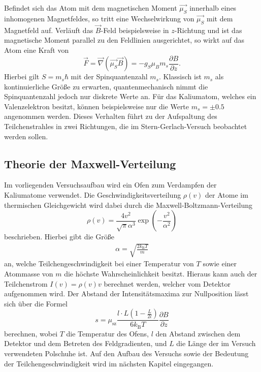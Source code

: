 Befindet sich das Atom mit dem magnetischen Moment $\vec{\mu_S}$ innerhalb eines inhomogenen Magnetfeldes, so tritt eine Wechselwirkung von $\vec{\mu_S}$ mit dem Magnetfeld auf.
Verläuft das $\vec{B}$-Feld beispielsweise in $z$-Richtung und ist das magnetische Moment parallel zu den Feldlinien ausgerichtet, so wirkt auf das Atom eine Kraft von
\begin{equation}
  \vec{F} = \vec{\nabla}\!\left( \vec{\mu_S} \vec{B} \right) = -g_S \mu_B m_s \frac{\partial B}{\partial z}.
\end{equation}
Hierbei gilt $S=m_s \hbar$ mit der Spinquantenzahl $m_s$.
Klassisch ist $m_s$ als kontinuierliche Größe zu erwarten, quantenmechanisch nimmt die Spinquantenzahl jedoch nur diskrete Werte an.
Für das Kaliumatom, welches ein Valenzelektron besitzt, können beispielsweise nur die Werte $m_s = \pm \num{0.5}$ angenommen werden.
Dieses Verhalten führt zu der Aufspaltung des Teilchenstrahles in zwei Richtungen, die im Stern-Gerlach-Versuch beobachtet werden sollen.

\subsection{Theorie der Maxwell-Verteilung}

Im vorliegenden Versuchsaufbau wird ein Ofen zum Verdampfen der Kaliumatome verwendet.
Die Geschwindigkeitsverteilung $\rho(v)$ der Atome im thermischen Gleichgewicht wird dabei durch die Maxwell-Boltzmann-Verteilung
\begin{equation}
  \label{eqn:geschwindigkeit}
  \rho(v) = \frac{4 v^2}{\sqrt{\pi}\alpha^3} \exp{\left(-\frac{v^2}{\alpha^2} \right)}
\end{equation}
beschrieben.
Hierbei gibt die Größe
\begin{align*}
  \alpha = \sqrt{ \frac{2 k_\text{B} T}{m}}
\end{align*}
an, welche Teilchengeschwindigkeit bei einer Temperatur von $T$ sowie einer Atommasse von $m$ die höchste Wahrscheinlichkeit besitzt.
Hieraus kann auch der Teilchenstrom $I(v) = \rho(v) v$ berechnet werden, welcher vom Detektor aufgenommen wird.
Der Abstand der Intensitätsmaxima zur Nullposition lässt sich über die Formel
\begin{equation}
  \label{eqn:namebittehierergaenzen}
 s = \mu_{\text{sz}}\frac{l\cdot L(1-\frac{L}{2l})}{6k_{\text{B}}T}\frac{\partial B}{\partial z}
\end{equation}
berechnen, wobei $T$ die Temperatur des Ofens, $l$ den Abstand zwischen dem Detektor und dem Betreten des Feldgradienten, und $L$ die Länge der im Versuch verwendeten Polschuhe ist.
Auf den Aufbau des Versuchs sowie der Bedeutung der Teilchengeschwindigkeit wird im nächsten Kapitel eingegangen.

